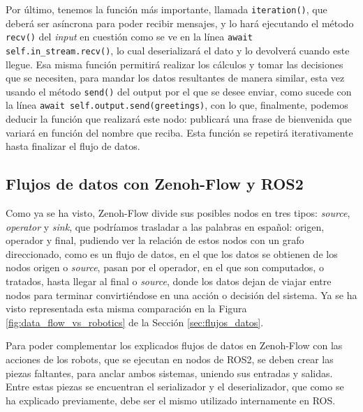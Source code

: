 Por último, tenemos la función más importante, llamada \verb|iteration()|, que
deberá ser asíncrona para poder recibir mensajes, y lo hará ejecutando el método
\verb|recv()| del \textit{input} en cuestión como se ve en la línea
\verb|await self.in_stream.recv()|, lo cual deserializará el dato y lo devolverá
cuando este llegue.
Esa misma función permitirá realizar los cálculos y tomar las decisiones que se
necesiten, para mandar los datos resultantes de manera similar, esta vez usando
el método \verb|send()| del output por el que se desee enviar, como sucede con
la línea \verb|await self.output.send(greetings)|, con lo que, finalmente,
podemos deducir la función que realizará este nodo: publicará una frase de
bienvenida que variará en función del nombre que reciba.
Esta función se repetirá iterativamente hasta finalizar el flujo de datos.
\\



\subsection{Flujos de datos con Zenoh-Flow y ROS2}
\label{sec:zf_ros}
Como ya se ha visto, Zenoh-Flow divide sus posibles nodos en tres tipos:
\textit{source}, \textit{operator} y \textit{sink}, que podríamos trasladar a
las palabras en español: origen, operador y final, pudiendo ver la relación de
estos nodos con un grafo direccionado, como es un flujo de datos, en el que
los datos se obtienen de los nodos origen o \textit{source}, pasan por el
operador, en el que son computados, o tratados, hasta llegar al final o
\textit{source}, donde los datos dejan de viajar entre nodos para terminar
convirtiéndose en una acción o decisión del sistema.
Ya se ha visto representada esta misma comparación en la Figura
\ref{fig:data_flow_vs_robotics} de la Sección \ref{sec:flujos_datos}.

Para poder complementar los explicados flujos de datos en Zenoh-Flow con las
acciones de los robots, que se ejecutan en nodos de ROS2, se deben crear las
piezas faltantes, para anclar ambos sistemas, uniendo sus entradas y salidas.
Entre estas piezas se encuentran el serializador y el deserializador, que como
se ha explicado previamente, debe ser el mismo utilizado internamente en ROS.
\\

